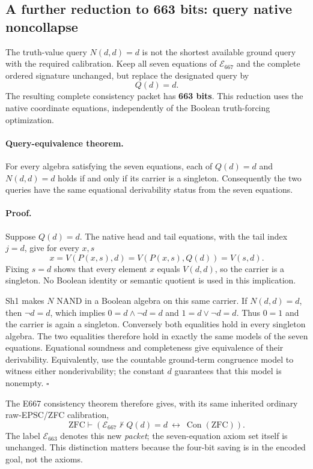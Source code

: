 \subsection{A further reduction to 663 bits: query native noncollapse}
\label{sec:e663}

The truth-value query $N(d,d)=d$ is not the shortest available ground
query with the required calibration.  Keep all seven equations of
$\mathcal E_{667}$ and the complete ordered signature unchanged, but
replace the designated query by
\begin{equation}
                            Q(d)=d.
 \label{eq:e663-query}
\end{equation}
The resulting complete consistency packet has \textbf{663 bits}.
This reduction uses the native coordinate equations, independently of
the Boolean truth-forcing optimization.

\paragraph{Query-equivalence theorem.}
For every algebra satisfying the seven equations, each of
$Q(d)=d$ and $N(d,d)=d$ holds if and only if its carrier is a
singleton.  Consequently the two queries have the same equational
derivability status from the seven equations.

\paragraph{Proof.}
Suppose $Q(d)=d$.  The native head and tail equations, with the
tail index $j=d$, give for every $x,s$
\[
 x=V(P(x,s),d)=V(P(x,s),Q(d))=V(s,d).
\]
Fixing $s=d$ shows that every element $x$ equals $V(d,d)$, so the
carrier is a singleton.  No Boolean identity or semantic quotient
is used in this implication.

Sh1 makes $N$ NAND in a Boolean algebra on this same carrier.
If $N(d,d)=d$, then $\neg d=d$, which implies
$0=d\wedge\neg d=d$ and $1=d\vee\neg d=d$.
Thus $0=1$ and the carrier is again a singleton.  Conversely both
equalities hold in every singleton algebra.  The two equalities
therefore hold in exactly the same models of the seven equations.
Equational soundness and completeness give equivalence of their
derivability.  Equivalently, use the countable ground-term congruence
model to witness either nonderivability; the constant $d$ guarantees
that this model is nonempty.
\hfill$\square$

The E667 consistency theorem therefore gives, with its same inherited
ordinary raw-EPSC/ZFC calibration,
\[
 \mathrm{ZFC}\vdash
 \left(\mathcal E_{667}\nvdash Q(d)=d
              \ \longleftrightarrow\ \operatorname{Con}(\mathrm{ZFC})\right).
\]
The label $\mathcal E_{663}$ denotes this new \emph{packet}; the
seven-equation axiom set itself is unchanged.  This distinction matters
because the four-bit saving is in the encoded goal, not the axioms.

